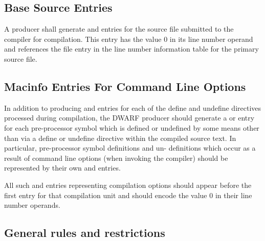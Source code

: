 \subsection{Base Source Entries} 
\label{chap:basesourceentries}

A producer shall generate  and
 entries for the source file submitted to
the compiler for compilation. This  entry
has the value 0 in its line number operand and references
the file entry in the line number information table for the
primary source file.


\subsection{Macinfo Entries For Command Line Options}
\label{chap:macinfoentriesforcommandlineoptions}

In addition to producing  and 
entries for each of the define and undefine directives
processed during compilation, the DWARF producer should
generate a  or  entry for
each pre-processor symbol which is defined or undefined by
some means other than via a define or undefine directive
within the compiled source text. In particular, pre-processor
symbol definitions and un- definitions which occur as a
result of command line options (when invoking the compiler)
should be represented by their own  and
 entries.

All such  and  entries
representing compilation options should appear before the
first  entry for that compilation unit
and should encode the value 0 in their line number operands.


\subsection{General rules and restrictions}
\label{chap:generalrulesandrestrictions}

